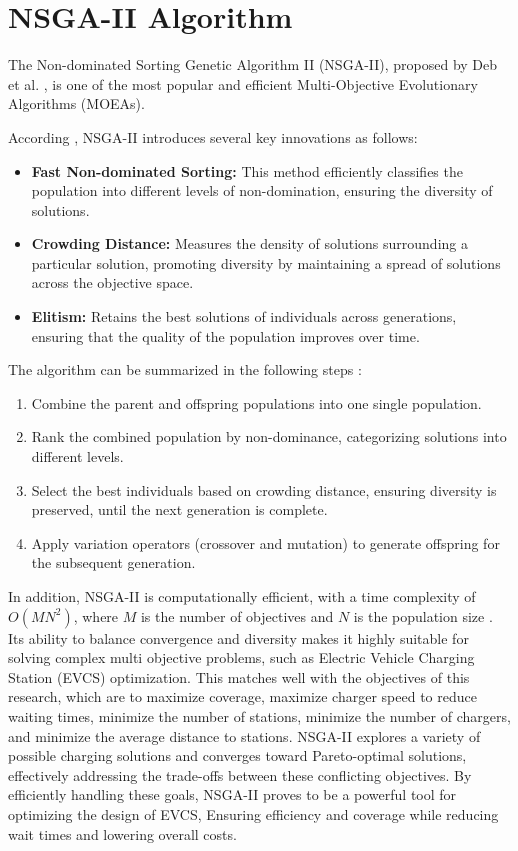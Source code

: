 \section{NSGA-II Algorithm}

The Non-dominated Sorting Genetic Algorithm II (NSGA-II), proposed by Deb et al. \cite{IEEE Transactions on Evolutionary Computation}, is one of the most popular and efficient Multi-Objective Evolutionary Algorithms (MOEAs).

According \cite{IEEE Transactions on Evolutionary Computation} , NSGA-II introduces several key innovations as follows:
\begin{itemize}
    \item \textbf{Fast Non-dominated Sorting:} This method efficiently classifies the population into different levels of non-domination, ensuring the diversity of solutions.
    \item \textbf{Crowding Distance:} Measures the density of solutions surrounding a particular solution, promoting diversity by maintaining a spread of solutions across the objective space.
    \item \textbf{Elitism:} Retains the best solutions of individuals across generations, ensuring that the quality of the population improves over time.
\end{itemize}

The algorithm can be summarized in the following steps \cite{IEEE Transactions on Evolutionary Computation}:

\begin{enumerate} \item Combine the parent and offspring populations into one single population. \item Rank the combined population by non-dominance, categorizing solutions into different levels. \item Select the best individuals based on crowding distance, ensuring diversity is preserved, until the next generation is complete. \item Apply variation operators (crossover and mutation) to generate offspring for the subsequent generation. \end{enumerate}


In addition, NSGA-II is computationally efficient, with a time complexity of \(O(MN^2)\), where \(M\) is the number of objectives and \(N\) is the population size \cite{IEEE Transactions on Evolutionary Computation}. Its ability to balance convergence and diversity makes it highly suitable for solving complex multi objective problems, such as Electric Vehicle Charging Station (EVCS) optimization. This matches well with the objectives of this research, which are to maximize coverage, maximize charger speed to reduce waiting times, minimize the number of stations, minimize the number of chargers, and minimize the average distance to stations. NSGA-II explores a variety of possible charging solutions and converges toward Pareto-optimal solutions, effectively addressing the trade-offs between these conflicting objectives. By efficiently handling these goals, NSGA-II proves to be a powerful tool for optimizing the design of EVCS, Ensuring efficiency and coverage while reducing wait times and lowering overall costs.


